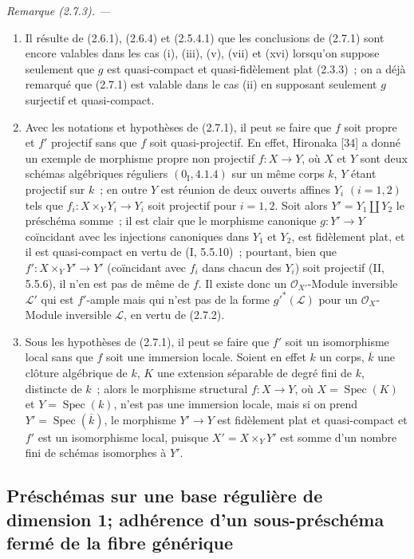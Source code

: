 \documentclass[10pt,oneside]{book}
\newenvironment{remark}[1][]{%
  \par\medskip\noindent\itshape Remarque (#1). ---\ }{\par}
\begin{document}
\begin{remark}[2.7.3]
\label{IV.2.7.3-fr}
\begin{enumerate}
\item[(i)] Il résulte de (2.6.1), (2.6.4) et (2.5.4.1) que les conclusions
de (2.7.1) sont encore valables dans les cas (i), (iii), (v), (vii) et
(xvi) lorsqu'on suppose seulement que $g$ est quasi-compact et
quasi-fidèlement plat (2.3.3)~; on a déjà remarqué que (2.7.1) est valable
dans le cas (ii) en supposant seulement $g$ surjectif et quasi-compact.

\item[(ii)] Avec les notations et hypothèses de (2.7.1), il peut se faire
que $f$ soit propre et $f'$ projectif sans que $f$ soit quasi-projectif. En
effet, Hironaka [34] a donné un exemple de morphisme propre non projectif
$f:X\to Y$, où $X$ et $Y$ sont deux schémas algébriques réguliers
$(0_{\mathrm I},4.1.4)$ sur un même corps $k$, $Y$ étant projectif sur $k$~;
en outre $Y$ est réunion de deux ouverts affines $Y_i$ $(i=1,2)$ tels que
$f_i:X\times_Y Y_i\to Y_i$ soit projectif pour $i=1,2$. Soit alors
$Y'=Y_1\amalg Y_2$ le préschéma somme~; il est clair que le morphisme
canonique $g:Y'\to Y$ coïncidant avec les injections canoniques dans $Y_1$
et $Y_2$, est fidèlement plat, et il est quasi-compact en vertu de
(I, 5.5.10)~; pourtant, bien que $f':X\times_Y Y'\to Y'$ (coïncidant avec
$f_i$ dans chacun des $Y_i$) soit projectif (II, 5.5.6), il n'en est pas de
même de $f$. Il existe donc un $\mathcal O_{X'}$-Module inversible
$\mathcal L'$ qui est $f'$-ample mais qui n'est pas de la forme
$g'^*(\mathcal L)$ pour un $\mathcal O_X$-Module inversible $\mathcal L$, en
vertu de (2.7.2).

\item[(iii)] Sous les hypothèses de (2.7.1), il peut se faire que $f'$ soit
un isomorphisme local sans que $f$ soit une immersion locale. Soient en
effet $k$ un corps, $\overline k$ une clôture algébrique de $k$, $K$ une
extension séparable de degré fini de $k$, distincte de $k$~; alors le
morphisme structural $f:X\to Y$, où $X=\operatorname{Spec}(K)$ et
$Y=\operatorname{Spec}(k)$, n'est pas une immersion locale, mais si on prend
$Y'=\operatorname{Spec}(\overline k)$, le morphisme $Y'\to Y$ est
fidèlement plat et quasi-compact et $f'$ est un isomorphisme local, puisque
$X'=X\times_Y Y'$ est somme d'un nombre fini de schémas isomorphes à $Y'$.
\end{enumerate}
\end{remark}

\subsection{Préschémas sur une base régulière de dimension 1; adhérence d'un
sous-préschéma fermé de la fibre générique}
\label{subsection:IV.2.8-fr}
\end{document}
